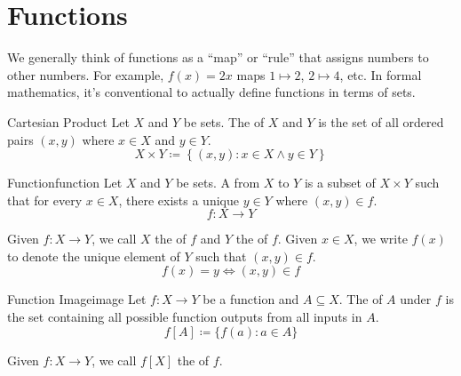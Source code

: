 \documentclass[12pt]{report}
\begin{document}
\section{Functions}
We generally think of functions as a ``map'' or ``rule'' that assigns numbers to other numbers. For example, $f(x) = 2x$ maps $1 \mapsto 2$, $2 \mapsto 4$, etc. In formal mathematics, it's conventional to actually define functions in terms of sets.


\begin{dfnbox}{Cartesian Product}{}
    Let $X$ and $Y$ be sets. The  of $X$ and $Y$ is the set of all ordered pairs $(x,y)$ where $x \in X$ and $y \in Y$.
    \tcblower
    \[ X \times Y \coloneq \left\{ (x,y) : x \in X \land y \in Y \right\} \]
\end{dfnbox}

\begin{dfnbox}{Function}{function}
    Let $X$ and $Y$ be sets. A  from $X$ to $Y$ is a subset of $X \times Y$ such that for every $x \in X$, there exists a unique $y \in Y$ where $(x,y) \in f$.
    \tcblower
    \[ f : X \to Y \]
\end{dfnbox}


Given $f : X \to Y$, we call $X$ the  of $f$ and $Y$ the  of $f$. Given $x \in X$, we write $f(x)$ to denote the unique element of $Y$ such that $(x,y) \in f$.
\[ f(x) = y \iff (x,y) \in f \]

\begin{dfnbox}{Function Image}{image}
    Let $f : X \to Y$ be a function and $A \subseteq X$. The  of $A$ under $f$ is the set containing all possible function outputs from all inputs in $A$.
    \tcblower
    \[ f[A] \coloneq \{ f(a) : a \in A \} \]
\end{dfnbox}

Given $f : X \to Y$, we call $f[X]$ the  of $f$.
\end{document}

